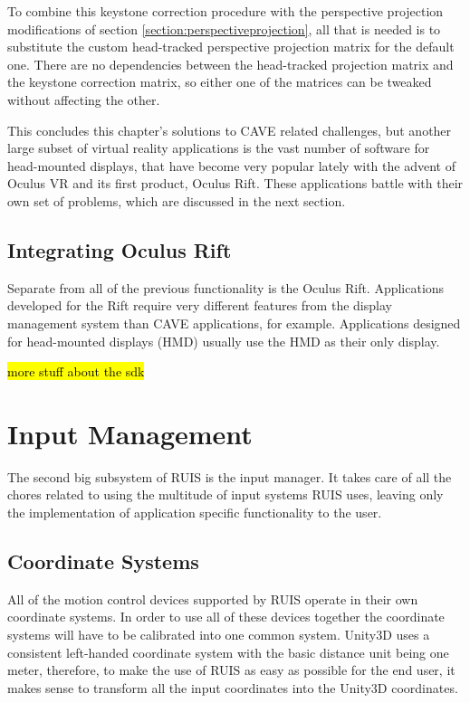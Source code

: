 \documentclass[12pt,a4paper,oneside,pdftex]{report}
\begin{document}
To combine this keystone correction procedure with the perspective projection modifications of section \ref{section:perspectiveprojection}, all that is needed is to substitute the custom head-tracked perspective projection matrix for the default one. There are no dependencies between the head-tracked projection matrix and the keystone correction matrix, so either one of the matrices can be tweaked without affecting the other. 

This concludes this chapter's solutions to CAVE related challenges, but another large subset of virtual reality applications is the vast number of software for head-mounted displays, that have become very popular lately with the advent of Oculus VR and its first product, Oculus Rift. These applications battle with their own set of problems, which are discussed in the next section.

\section{Integrating Oculus Rift}
\label{section:integratingoculusrift}

Separate from all of the previous functionality is the Oculus Rift. Applications developed for the Rift require very different features from the display management system than CAVE applications, for example. Applications designed for head-mounted displays (HMD) usually use the HMD as their only display. 

\hl{more stuff about the sdk}



\chapter{Input Management}
\label{chapter:inputmanagement}

The second big subsystem of RUIS is the input manager. It takes care of all the chores related to using the multitude of input systems RUIS uses, leaving only the implementation of application specific functionality to the user.

\section{Coordinate Systems}
\label{section:coordinatesystem}

All of the motion control devices supported by RUIS operate in their own coordinate systems. In order to use all of these devices together the coordinate systems will have to be calibrated into one common system. Unity3D uses a consistent left-handed coordinate system with the basic distance unit being one meter, therefore, to make the use of RUIS as easy as possible for the end user, it makes sense to transform all the input coordinates into the Unity3D coordinates.
\end{document}
